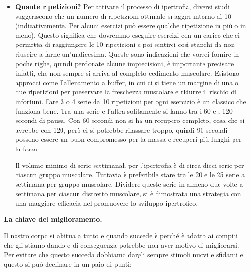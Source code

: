 \documentclass[12pt]{book} %
\begin{document}
\begin{itemize}
\item \textbf{Quante ripetizioni?}
Per attivare il processo di ipertrofia, diversi studi suggeriscono che un numero di ripetizioni ottimale si aggiri intorno al 10 (indicativamente. Per alcuni esercizi può essere qualche ripetizione in più o in meno). Questo significa che dovremmo eseguire esercizi con un carico che ci permetta di raggiungere le 10 ripetizioni e poi sentirci così stanchi da non riuscire a farne un'undicesima.
Queste sono indicazioni che vorrei fornire in poche righe, quindi perdonate alcune imprecisioni, è importante precisare infatti, che non sempre si arriva al completo cedimento muscolare. Esistono approcci come l'allenamento a buffer, in cui ci si tiene un margine di una o due ripetizioni per preservare la freschezza muscolare e ridurre il rischio di infortuni.
Fare 3 o 4 serie da 10 ripetizioni per ogni esercizio è un classico che funziona bene. Tra una serie e l'altra solitamente si fanno tra i 60 e i 120 secondi di pausa. Con 60 secondi non si ha un recupero completo, cosa che si avrebbe con 120, però ci si potrebbe rilassare troppo, quindi 90 secondi possono essere un buon compromesso per la massa e recuperi più lunghi per la forza.

Il volume minimo di serie settimanali per l'ipertrofia è di circa dieci serie per ciascun gruppo muscolare. Tuttavia è preferibile stare tra le 20 e le 25 serie a settimana per gruppo muscolare. Dividere queste serie in almeno due volte a settimana per ciascun distretto muscolare, si è dimostrata una strategia con una maggiore efficacia nel promuovere lo sviluppo ipertrofico.
\end{itemize}

\textbf{La chiave del miglioramento.}

Il nostro corpo si abitua a tutto e quando succede è perché è adatto ai compiti che gli stiamo dando e di conseguenza potrebbe non aver motivo di migliorarsi.
Per evitare che questo succeda dobbiamo dargli sempre stimoli nuovi e sfidanti e questo si può declinare in un paio di punti:
\end{document}

